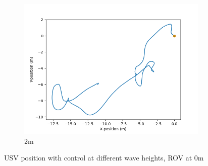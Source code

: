 \documentclass[class=article, crop=false]{standalone}
\begin{document}
\begin{figure}
\begin{subfigure}[b]{0.48\textwidth}
        \includegraphics{scenario1/rov-0m/2.0m/usv_position_controlled}
        \caption{2m}
        \label{}
    \end{subfigure}

    \caption{USV position with control at different wave heights, ROV at 0m}
\end{figure}
\end{document}
